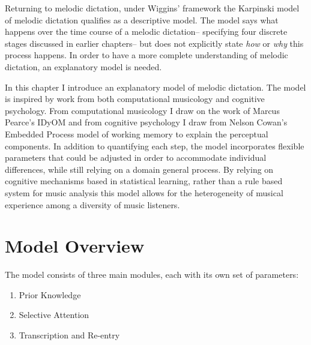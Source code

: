 \documentclass[]{book}
\providecommand{\tightlist}{%
  \setlength{\itemsep}{0pt}\setlength{\parskip}{0pt}}
\begin{document}
Returning to melodic dictation, under Wiggins' framework the Karpinski model of melodic dictation \citep{karpinskiAuralSkillsAcquisition2000, karpinskiModelMusicPerception1990} qualifies as a descriptive model.
The model says what happens over the time course of a melodic dictation-- specifying four discrete stages discussed in earlier chapters-- but does not explicitly state \emph{how} or \emph{why} this process happens.
In order to have a more complete understanding of melodic dictation, an explanatory model is needed.

In this chapter I introduce an explanatory model of melodic dictation.
The model is inspired by work from both computational musicology and cognitive psychology.
From computational musicology I draw on the work of Marcus Pearce's IDyOM \citep{pearceConstructionEvaluationStatistical2005} and from cognitive psychology I draw from Nelson Cowan's Embedded Process model of working memory \citep{cowanEvolvingConceptionsMemory1988, cowanMagicalMysteryFour2010} to explain the perceptual components.
In addition to quantifying each step, the model incorporates flexible parameters that could be adjusted in order to accommodate individual differences, while still relying on a domain general process.
By relying on cognitive mechanisms based in statistical learning, rather than a rule based system for music analysis \citep{lerdahlGenerativeTheoryTonal1986, narmourAnalysisCognitionBasic1990, narmourAnalysisCognitionMelodic1992, temperleyCognitionBasicMusical2004} this model allows for the heterogeneity of musical experience among a diversity of music listeners.

\hypertarget{model-overview}{%
\section{Model Overview}\label{model-overview}}

The model consists of three main modules, each with its own set of parameters:

\begin{enumerate}
\def\labelenumi{\arabic{enumi}.}
\tightlist
\item
  Prior Knowledge
\item
  Selective Attention
\item
  Transcription and Re-entry
\end{enumerate}
\end{document}
